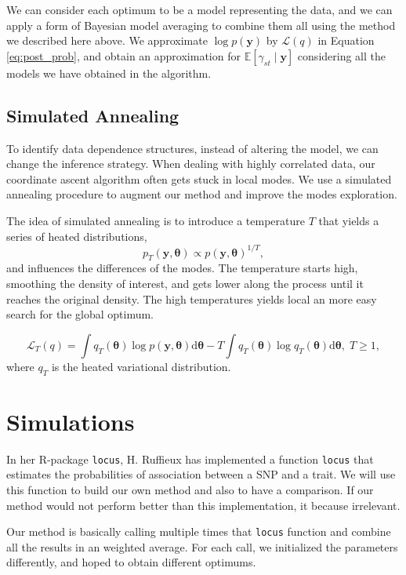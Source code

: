 \documentclass[a4paper, 11pt]{report}
\numberwithin{equation}{chapter}
\begin{document}
We can consider each optimum to be a model representing the data, and we can apply a form of Bayesian model averaging to combine them all using the method we described here above. We approximate $\log p(\boldsymbol{y})$ by $\mathcal{L}(q)$ in Equation \ref{eq:post_prob}, and obtain an approximation for $\mathbb{E}\left[\gamma_{st}\mid \boldsymbol{y}\right]$ considering all the models we have obtained in the algorithm.
\newpage
\section{Simulated Annealing}
To identify data dependence structures, instead of altering the model, we can change the inference strategy. When dealing with highly correlated data, our coordinate ascent algorithm often gets stuck in local modes. We use a simulated annealing procedure to augment our method and improve the modes exploration.

The idea of simulated annealing is to introduce a temperature $T$ that yields a series of heated distributions,
\begin{equation*}
p_T(\boldsymbol{y},\boldsymbol{\theta}) \propto p(\boldsymbol{y},\boldsymbol{\theta})^{1/T},
\end{equation*}
and influences the differences of the modes. The temperature starts high, smoothing the density of interest, and gets lower along the process until it reaches the original density. The high temperatures yields local an more easy search for the global optimum.

\begin{equation*}
\mathcal{L}_T(q) = \int q_T(\boldsymbol{\theta}) \log p(\boldsymbol{y},\boldsymbol{\theta})\mathrm{d}\boldsymbol{\theta} - T \int q_T(\boldsymbol{\theta}) \log q_T(\boldsymbol{\theta}) \mathrm{d}\boldsymbol{\theta},\; T\geq 1,
\end{equation*}
where $q_T$ is the heated variational distribution.
\newpage
\chapter{Simulations}
In her R-package \texttt{locus}, H. Ruffieux has implemented a function \texttt{locus} that estimates the probabilities of association between a SNP and a trait. We will use this function to build our own method and also to have a comparison. If our method would not perform better than this implementation, it because irrelevant.

Our method is basically calling multiple times that \texttt{locus} function and combine all the results in an weighted average. For each call, we initialized the parameters differently, and hoped to obtain different optimums.
\end{document}
